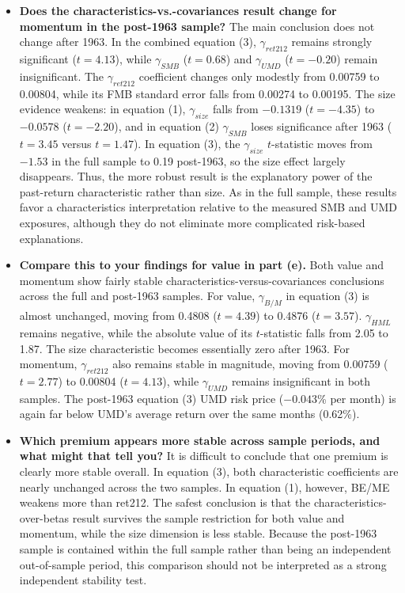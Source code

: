 \documentclass[11pt]{article}
\newenvironment{tight}
  {\begin{itemize}\setlength{\itemsep}{3pt}\setlength{\parskip}{0pt}%
   \setlength{\topsep}{3pt}\setlength{\leftmargini}{1.4em}}
  {\end{itemize}}
\begin{document}
\begin{tight}
  \item \textbf{Does the characteristics-vs.-covariances result change for momentum in the
  post-1963 sample?} The main conclusion does not change after 1963. In the combined
  equation (3), $\gamma_{ret212}$ remains strongly significant ($t = 4.13$), while
  $\gamma_{SMB}$ ($t = 0.68$) and $\gamma_{UMD}$ ($t = -0.20$) remain insignificant. The
  $\gamma_{ret212}$ coefficient changes only modestly from 0.00759 to 0.00804, while its
  FMB standard error falls from 0.00274 to 0.00195. The size evidence weakens: in equation
  (1), $\gamma_{size}$ falls from $-0.1319$ ($t = -4.35$) to $-0.0578$ ($t = -2.20$), and
  in equation (2) $\gamma_{SMB}$ loses significance after 1963 ($t = 3.45$ versus
  $t = 1.47$). In equation (3), the $\gamma_{size}$ $t$-statistic moves from $-1.53$ in
  the full sample to 0.19 post-1963, so the size effect largely disappears. Thus, the more
  robust result is the explanatory power of the past-return characteristic rather than
  size. As in the full sample, these results favor a characteristics interpretation
  relative to the measured SMB and UMD exposures, although they do not eliminate more
  complicated risk-based explanations.
  \item \textbf{Compare this to your findings for value in part (e).} Both value and
  momentum show fairly stable characteristics-versus-covariances conclusions across the
  full and post-1963 samples. For value, $\gamma_{B/M}$ in equation (3) is almost
  unchanged, moving from 0.4808 ($t = 4.39$) to 0.4876 ($t = 3.57$). $\gamma_{HML}$
  remains negative, while the absolute value of its $t$-statistic falls from 2.05 to 1.87.
  The size characteristic becomes essentially zero after 1963. For momentum,
  $\gamma_{ret212}$ also remains stable in magnitude, moving from 0.00759 ($t = 2.77$) to
  0.00804 ($t = 4.13$), while $\gamma_{UMD}$ remains insignificant in both samples. The
  post-1963 equation (3) UMD risk price ($-0.043$\% per month) is again far below UMD's
  average return over the same months (0.62\%).
  \item \textbf{Which premium appears more stable across sample periods, and what might
  that tell you?} It is difficult to conclude that one premium is clearly more stable
  overall. In equation (3), both characteristic coefficients are nearly unchanged across
  the two samples. In equation (1), however, BE/ME weakens more than ret212. The safest
  conclusion is that the characteristics-over-betas result survives the sample
  restriction for both value and momentum, while the size dimension is less stable.
  Because the post-1963 sample is contained within the full sample rather than being an
  independent out-of-sample period, this comparison should not be interpreted as a strong
  independent stability test.
\end{tight}
\end{document}
